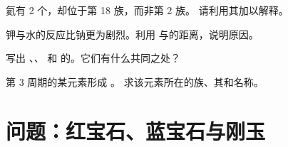 \begin{exercise}[$\star\star\star$]\label{exo:g10:electron-shells:12}
氦有 2 个，却位于第 18 族，而非第 2 族。
请利用其加以解释。
\end{exercise}

\begin{exercise}[$\star\star\star$]\label{exo:g10:electron-shells:13}
钾与水的反应比钠更为剧烈。利用
与的距离，说明原因。
\end{exercise}

\begin{exercise}[$\star\star\star$]\label{exo:g10:electron-shells:14}
写出 、、 和
 的。它们有什么共同之处？
\end{exercise}

\begin{exercise}[$\star\star\star$]\label{exo:g10:electron-shells:15}
第 3 周期的某元素形成 。
求该元素所在的族、其和名称。
\end{exercise}

\section{问题：红宝石、蓝宝石与刚玉}

